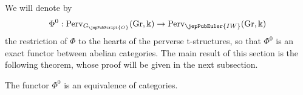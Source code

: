 We will denote by
\[
 \Phi^0 : \mathrm{Perv}_{G_{\jepPubScript{O}}}(\mathrm{Gr}, \Bbbk) \to \mathrm{Perv}_{\jepPubEuler{IW}}(\mathrm{Gr}, \Bbbk)
\]
the restriction of $\Phi$ to the hearts of the perverse t-structures, so that $\Phi^0$ is an exact functor between abelian categories.
The main result of this section is the following theorem, whose proof will be given in the next subsection.

\begin{thm}
\label{jep104local038}
The functor $\Phi^0$ is an equivalence of categories.
\end{thm}

